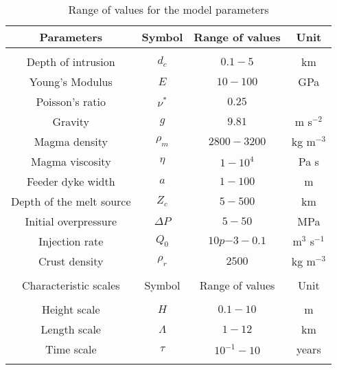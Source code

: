 \begin{table}
  \caption{Range of values for the model parameters}
  \centering
  \begin{tabular}{c|c|c|c}
    \hline
    Parameters& Symbol & Range of values &Unit\\
    \hline
              &&\\
    Depth of intrusion & $d_c$ & $0.1-5$ &km \\
    Young's Modulus & $E$ & $10-100$ &GPa \\
    Poisson's ratio & $\nu^*$ & $0.25$ &\\
    Gravity & $g$ & $9.81$ &m s$^{-2}$ \\
    Magma density & $\rho_{m}$ & $2800-3200$ &kg m$^{-3}$ \\
    Magma viscosity & $\eta $ & $1-10^{4}$ &Pa s \\
    Feeder dyke width & $a$ & $1-100$ &m \\
    Depth of the melt source & $Z_{c}$ & $ 5-500$& km \\ 
    Initial overpressure & $\Delta P$ & $5-50$ &MPa \\
    Injection rate & $Q_{0}$ &$10p{-3}-0.1$ &m$^{3}$ s$^{-1}$ \\
    Crust density & $\rho_{r}$ & $2500$ &kg m$^{-3}$ \\
              &&\\
    \hline
    Characteristic scales & Symbol & Range of values & Unit\\
    \hline
              &&\\
    Height scale & $H$& $0.1-10$ &m \\
    Length scale & $\Lambda$ & $1-12$& km \\
    Time scale & $\tau$ & $10^{-1}-10$ &years \\
    \label{tab2}
  \end{tabular} 
\end{table}







